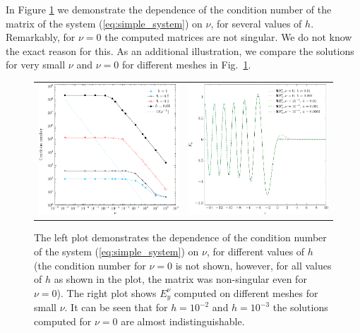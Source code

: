 In Figure \ref{fig:small_nu} we demonstrate the dependence of the condition number of the matrix of the system (\ref{eq:simple_system}) 
on $\nu$, for several values of $h$.
Remarkably, for $\nu=0$ the computed matrices are not singular. We do not know the exact reason for this.
As an additional illustration, we compare the solutions for very small $\nu$ and $\nu=0$ for different meshes in Fig.~\ref{fig:small_nu}. 
\begin{figure}[htb!]
\begin{tabular}{cc}
\includegraphics[height=0.32\textwidth]{pics_frequency_domain/fig_cond_num.pdf}&
 \includegraphics[height=0.32\textwidth]{pics_frequency_domain/ey_resonance.pdf}
 \end{tabular}
 \caption{
 The left plot demonstrates the dependence of the condition number of the system (\ref{eq:simple_system}) on $\nu$, for different values of $h$ (the condition 
 number for $\nu=0$ is not shown, however, for all values of $h$ as shown in the plot, the matrix was non-singular even for $\nu=0$). 
 The right plot shows $E_{y}^{\nu}$ computed on different meshes for small $\nu$. It can be seen that for $h=10^{-2}$ and $h=10^{-3}$ the solutions 
 computed for $\nu=0$ are almost indistinguishable.}
 \label{fig:small_nu}
\end{figure}
